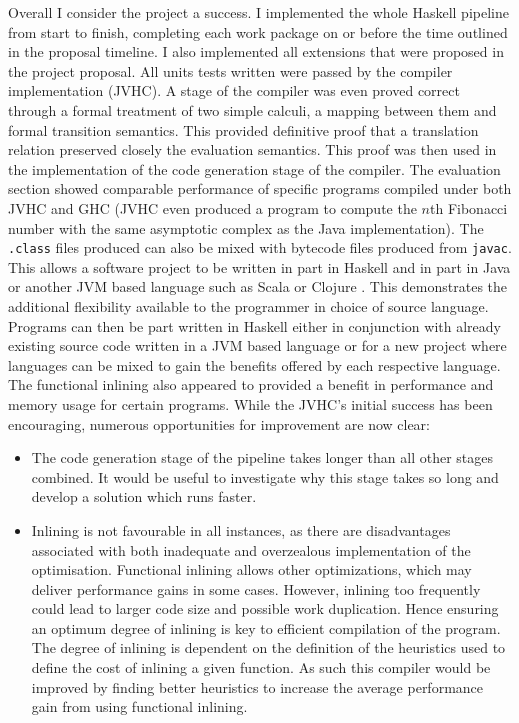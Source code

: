 \documentclass[float=false, crop=false]{standalone}
\begin{document}
Overall I consider the project a success. I implemented the whole Haskell
pipeline from start to finish, completing each work package on or
before the time outlined in the proposal timeline. I also implemented
all extensions that were proposed in the project proposal. 
All units tests written were passed by the compiler implementation (JVHC). 
A stage of the compiler was even proved correct through
a formal treatment of two simple calculi, a mapping between them
and formal transition semantics. This provided definitive proof that a translation
relation preserved closely the evaluation semantics. This proof was then 
used in the implementation of the code generation stage of the compiler.
The evaluation section showed comparable performance of specific programs
compiled under both JVHC and GHC (JVHC even produced a program to compute
the $n$th Fibonacci number with the same asymptotic complex as the Java
implementation). The \verb|.class| files produced can also be mixed with 
bytecode files produced from \verb|javac|. This allows a software project to
be written in part in Haskell and in part in Java or another JVM based language
such as Scala \cite{scala} or Clojure \cite{clojure}. This demonstrates the 
additional flexibility available to the programmer in choice of source language.
Programs can then be part written in Haskell either in conjunction with already 
existing source code written in a JVM based language or for a new project
where languages can be mixed to gain the benefits offered by each respective language.
The functional inlining also
appeared to provided a benefit in performance and memory usage for certain
programs. 
While the JVHC’s initial success has been encouraging, numerous opportunities for improvement are now clear:
\begin{itemize}

\item The code generation stage of the pipeline takes longer than all other stages 
combined. It would be useful to investigate why this stage takes so long 
and develop a solution which runs faster.

\item Inlining is not favourable in all instances, as there are disadvantages associated with both inadequate and overzealous implementation of the optimisation.  Functional inlining allows other optimizations, which may deliver performance gains in some cases. However, inlining too frequently could lead to larger code size and possible work duplication. Hence ensuring an optimum degree of inlining is key to efficient compilation of the program. The degree of inlining is dependent on the definition of the heuristics used to define the cost of inlining a given function. As such this compiler would be improved by finding better heuristics to increase the average performance gain from using functional inlining.
\end{itemize}
\end{document}
